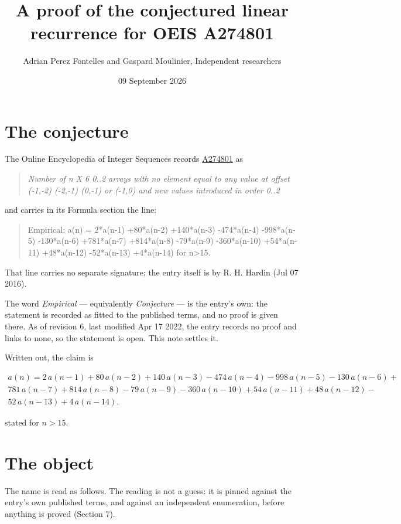 \documentclass[11pt]{article}
\title{A proof of the conjectured linear recurrence for OEIS A274801}
\author{Adrian Perez Fontelles and Gaspard Moulinier, Independent researchers}
\date{09 September 2026}
\theoremstyle{definition}
\begin{document}
\maketitle
\section{The conjecture}

The Online Encyclopedia of Integer Sequences records \href{https://oeis.org/A274801}{A274801} as

\begin{quote}\itshape Number of n X 6 0..2 arrays with no element equal to any value at offset (-1,-2) (-2,-1) (0,-1) or (-1,0) and new values introduced in order 0..2\end{quote}

and carries in its Formula section the line:

\begin{quote}\ttfamily Empirical: a(n) = 2*a(n-1) +80*a(n-2) +140*a(n-3) -474*a(n-4) -998*a(n-5) -130*a(n-6) +781*a(n-7) +814*a(n-8) -79*a(n-9) -360*a(n-10) +54*a(n-11) +48*a(n-12) -52*a(n-13) +4*a(n-14) for n>15.\end{quote}

That line carries no separate signature; the entry itself is by R. H. Hardin (Jul 07 2016).

The word {\itshape Empirical} --- equivalently {\itshape Conjecture} --- is the entry's own: the statement is recorded as fitted to the published terms, and no proof is given there. As of revision 6, last modified Apr 17 2022, the entry records no proof and links to none, so the statement is open. This note settles it.

Written out, the claim is

\begin{multline*} a(n) = 2\,a(n-1) + 80\,a(n-2) + 140\,a(n-3) - 474\,a(n-4) - 998\,a(n-5) - 130\,a(n-6) + \\ 781\,a(n-7) + 814\,a(n-8) - 79\,a(n-9) - 360\,a(n-10) + 54\,a(n-11) + 48\,a(n-12) - \\ 52\,a(n-13) + 4\,a(n-14). \end{multline*}

stated for $n > 15$.

\section{The object}

The name is read as follows. The reading is not a guess: it is pinned against the entry's own published terms, and against an independent enumeration, before anything is proved (Section 7).
\end{document}

